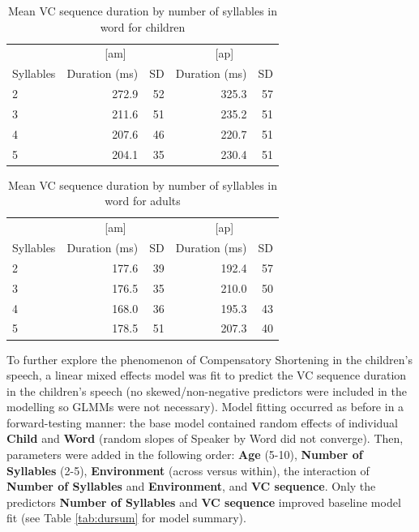 \documentclass[a4paper,man,floatsintext,natbib,donotrepeattitle, apacite]{apa6}
\begin{document}
\begin{table}[H]

\caption{\label{tab:dur-by-syll-kids}Mean VC sequence duration by number of syllables in word for children}
\centering
\begin{tabular}[t]{lrrrr}
\toprule
\multicolumn{1}{c}{ } & \multicolumn{2}{c}{[am]} & \multicolumn{2}{c}{[ap]} \\
\cmidrule(l{3pt}r{3pt}){2-3} \cmidrule(l{3pt}r{3pt}){4-5}
Syllables & Duration (ms) & SD  & Duration (ms) & SD\\
\midrule
2 & 272.9 & 52 & 325.3 & 57\\
3 & 211.6 & 51 & 235.2 & 51\\
4 & 207.6 & 46 & 220.7 & 51\\
5 & 204.1 & 35 & 230.4 & 51\\
\bottomrule
\end{tabular}
\end{table}

\begin{table}[H]

\caption{\label{tab:dur-by-syll-adults}Mean VC sequence duration by number of syllables in word for adults}
\centering
\begin{tabular}[t]{lrrrr}
\toprule
\multicolumn{1}{c}{ } & \multicolumn{2}{c}{[am]} & \multicolumn{2}{c}{[ap]} \\
\cmidrule(l{3pt}r{3pt}){2-3} \cmidrule(l{3pt}r{3pt}){4-5}
Syllables & Duration (ms) & SD  & Duration (ms) & SD\\
\midrule
2 & 177.6 & 39 & 192.4 & 57\\
3 & 176.5 & 35 & 210.0 & 50\\
4 & 168.0 & 36 & 195.3 & 43\\
5 & 178.5 & 51 & 207.3 & 40\\
\bottomrule
\end{tabular}
\end{table}





To further explore the phenomenon of Compensatory Shortening in the children's speech, a linear mixed effects model was fit to predict the VC sequence duration in the children's speech (no skewed/non-negative predictors were included in the modelling so GLMMs were not necessary). Model fitting occurred as before in a forward-testing manner: the base model contained random effects of individual \textbf{Child} and \textbf{Word} (random slopes of Speaker by Word did not converge). Then, parameters were added in the following order: \textbf{Age} (5-10), \textbf{Number of Syllables} (2-5), \textbf{Environment} (across versus within), the interaction of \textbf{Number of Syllables} and \textbf{Environment}, and \textbf{VC sequence}. Only the predictors \textbf{Number of Syllables} and \textbf{VC sequence} improved baseline model fit (see Table \ref{tab:dursum} for model summary).
\end{document}
